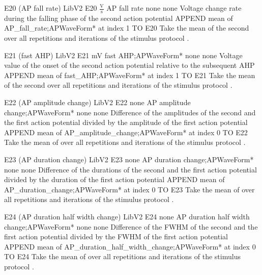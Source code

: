 \begin{efeature}
  {E20 (AP fall rate)}
  {LibV2}
  {E20}
  {$\frac{\mathrm{V}}{\mathrm{s}}$}
  {AP fall rate}
  {none}
  {none}
  {Voltage change rate during the falling phase of the second action potential}
  {
  APPEND mean of AP\_fall\_rate;APWaveForm* at index 1 TO E20
  }
  Take the mean of the second  over all repetitions and iterations of the stimulus protocol .
  
\end{efeature}

\begin{efeature}
  {E21 (fast AHP)}
  {LibV2}
  {E21}
  {mV}
  {fast AHP;APWaveForm*}
  {none}
  {none}
  {Voltage value of the onset of the second action potential relative to the subsequent AHP}
  {
  APPEND mean of fast\_AHP;APWaveForm* at index 1 TO E21
  }
  Take the mean of the second  over all repetitions and iterations of the stimulus protocol .
  
\end{efeature}

\begin{efeature}
  {E22 (AP amplitude change)}
  {LibV2}
  {E22}
  {none}
  {AP amplitude change;APWaveForm*}
  {none}
  {none}
  {Difference of the amplitudes of the second and the first action potential divided by the amplitude of the first action potential}
  {
  APPEND mean of AP\_amplitude\_change;APWaveForm* at index 0 TO E22
  }
  Take the mean of  over all repetitions and iterations of the stimulus protocol .
  
\end{efeature}

\begin{efeature}
  {E23 (AP duration change)}
  {LibV2}
  {E23}
  {none}
  {AP duration change;APWaveForm*}
  {none}
  {none}
  {Difference of the durations of the second and the first action potential divided by the duration of the first action potential}
  {
  APPEND mean of AP\_duration\_change;APWaveForm* at index 0 TO E23
  }
  Take the mean of  over all repetitions and iterations of the stimulus protocol .
  
\end{efeature}

\begin{efeature}
  {E24 (AP duration half width change)}
  {LibV2}
  {E24}
  {none}
  {AP duration half width change;APWaveForm*}
  {none}
  {none}
  {Difference of the FWHM of the second and the first action potential divided by the FWHM of the first action potential}
  {
  APPEND mean of AP\_duration\_half\_width\_change;APWaveForm* at index 0 TO E24
  }
  Take the mean of  over all repetitions and iterations of the stimulus protocol .
  
\end{efeature}

